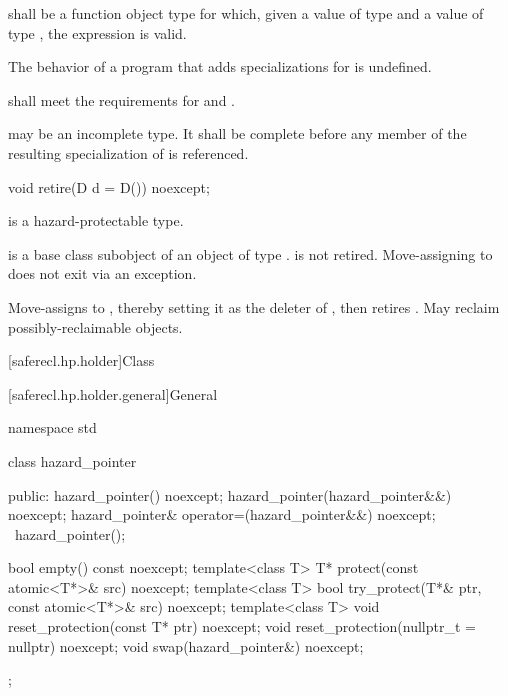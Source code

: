 \pnum
{} shall be a function object type
for which, given a value  of type  and
a value  of type ,
the expression  is valid.

\pnum
The behavior of a program
that adds specializations for  is undefined.

\pnum
{} shall meet the requirements for
 and .

\pnum
{} may be an incomplete type.
It shall be complete before any member
of the resulting specialization of 
is referenced.

%
\begin{itemdecl}
void retire(D d = D()) noexcept;
\end{itemdecl}

\begin{itemdescr}
\pnum
\mandates
{} is a hazard-protectable type.

\pnum
\expects
{} is
a base class subobject of an object  of type .
 is not retired.
Move-assigning  to  does not exit via an exception.

\pnum
\effects
Move-assigns  to ,
thereby setting it as the deleter of ,
then retires .
May reclaim possibly-reclaimable objects.
\end{itemdescr}

[saferecl.hp.holder]{Class }

[saferecl.hp.holder.general]{General}

\begin{codeblock}
namespace std {
  class hazard_pointer {
  public:
    hazard_pointer() noexcept;
    hazard_pointer(hazard_pointer&&) noexcept;
    hazard_pointer& operator=(hazard_pointer&&) noexcept;
    ~hazard_pointer();

    bool empty() const noexcept;
    template<class T> T* protect(const atomic<T*>& src) noexcept;
    template<class T> bool try_protect(T*& ptr, const atomic<T*>& src) noexcept;
    template<class T> void reset_protection(const T* ptr) noexcept;
    void reset_protection(nullptr_t = nullptr) noexcept;
    void swap(hazard_pointer&) noexcept;
  };
}
\end{codeblock}

